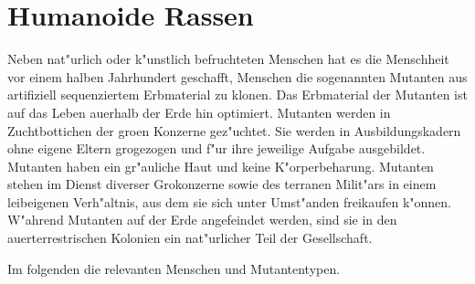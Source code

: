 \section{Humanoide Rassen}

Neben nat"urlich oder k"unstlich befruchteten Menschen hat es die Menschheit vor einem halben Jahrhundert geschafft, Menschen die sogenannten Mutanten aus artifiziell sequenziertem Erbmaterial zu klonen. Das Erbmaterial der Mutanten ist auf das Leben au\3erhalb der Erde hin optimiert. Mutanten werden in Zuchtbottichen der gro\3en Konzerne gez"uchtet. Sie werden in Ausbildungskadern ohne eigene Eltern gro\3gezogen und f"ur ihre jeweilige Aufgabe ausgebildet. Mutanten haben ein gr"auliche Haut und keine K"orperbeharung. Mutanten stehen im Dienst diverser Gro\3konzerne sowie des terranen Milit"ars in einem leibeigenen Verh"altnis, aus dem sie sich unter Umst"anden freikaufen k"onnen. W"ahrend Mutanten auf der Erde angefeindet werden, sind sie in den au\3erterrestrischen Kolonien ein nat"urlicher Teil der Gesellschaft.

Im folgenden die relevanten Menschen und Mutantentypen.

